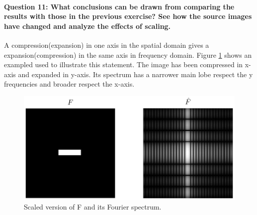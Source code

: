 \documentclass[12pt]{article}
\begin{document}
\paragraph{Question 11: What conclusions can be drawn from comparing the results with those in the previous exercise? See how the source images have changed and analyze the effects of scaling.}
A compression(expansion) in one axis in the spatial domain gives a expansion(compression) in the same axis in frequency domain. Figure \ref{fig:q11} shows an exampled used to illustrate this statement. The image has been compressed in x-axis and expanded in y-axis. Its spectrum has a narrower main lobe respect the y frequencies and broader respect the x-axis.

\begin{figure}[htbp]
 \centering
 \includegraphics[width=\textwidth]{q11}
 \caption{Scaled version of F and its Fourier spectrum.}
 \label{fig:q11}
\end{figure}
\end{document}
